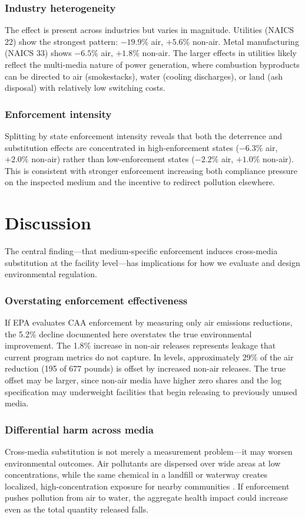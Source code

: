 \documentclass[12pt]{article}
\begin{document}
\subsubsection*{Industry heterogeneity} The effect is present across industries but varies in magnitude. Utilities (NAICS 22) show the strongest pattern: $-19.9\%$ air, $+5.6\%$ non-air. Metal manufacturing (NAICS 33) shows $-6.5\%$ air, $+1.8\%$ non-air. The larger effects in utilities likely reflect the multi-media nature of power generation, where combustion byproducts can be directed to air (smokestacks), water (cooling discharges), or land (ash disposal) with relatively low switching costs.

\subsubsection*{Enforcement intensity} Splitting by state enforcement intensity reveals that both the deterrence and substitution effects are concentrated in high-enforcement states ($-6.3\%$ air, $+2.0\%$ non-air) rather than low-enforcement states ($-2.2\%$ air, $+1.0\%$ non-air). This is consistent with stronger enforcement increasing both compliance pressure on the inspected medium and the incentive to redirect pollution elsewhere.


\section{Discussion}

The central finding---that medium-specific enforcement induces cross-media substitution at the facility level---has implications for how we evaluate and design environmental regulation.

\subsubsection*{Overstating enforcement effectiveness} If EPA evaluates CAA enforcement by measuring only air emissions reductions, the 5.2\% decline documented here overstates the true environmental improvement. The 1.8\% increase in non-air releases represents leakage that current program metrics do not capture. In levels, approximately 29\% of the air reduction (195 of 677 pounds) is offset by increased non-air releases. The true offset may be larger, since non-air media have higher zero shares and the log specification may underweight facilities that begin releasing to previously unused media.

\subsubsection*{Differential harm across media} Cross-media substitution is not merely a measurement problem---it may worsen environmental outcomes. Air pollutants are dispersed over wide areas at low concentrations, while the same chemical in a landfill or waterway creates localized, high-concentration exposure for nearby communities \citep{greenstone2012does}. If enforcement pushes pollution from air to water, the aggregate health impact could increase even as the total quantity released falls.
\end{document}
